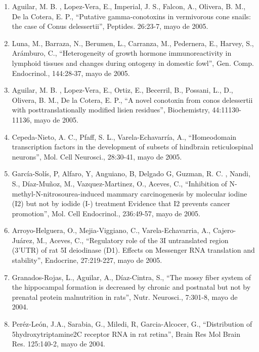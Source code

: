 \begin{enumerate}
\item Aguilar, M. B. , Lopez-Vera, E., Imperial, J. S., Falcon, A., Olivera, B. M., De la Cotera, E. P., “Putative 
gamma-conotoxins in vermivorous cone snails: the case of Conus delessertii”, Peptides. 26:23-7, mayo de 2005.

\item Luna, M., Barraza, N., Berumen, L., Carranza, M., Pedernera, E., Harvey, S., Arámburo, C., “Heterogeneity of growth 
hormone immunoreactivity in lymphoid tissues and changes during ontogeny in domestic fowl”, Gen. Comp. Endocrinol., 
144:28-37, mayo de 2005.

\item Aguilar, M. B. , Lopez-Vera, E., Ortiz, E., Becerril, B., Possani, L., D., Olivera, B. M., De la Cotera, E. P., “A 
novel conotoxin from conos delessertii with posttranslationally modified lisien residues”, Biochemistry, 
44:11130-11136, mayo de 2005.

\item Cepeda-Nieto, A. C., Pfaff, S. L., Varela-Echavarría, A., “Homeodomain transcription factors in the development of 
subsets of hindbrain reticulospinal neurons”, Mol. Cell Neurosci., 28:30-41, mayo de 2005.

\item García-Solís, P, Alfaro, Y, Anguiano, B, Delgado G, Guzman, R. C. , Nandi, S., Díaz-Muñoz, M., Vazquez-Martinez, O., 
Aceves, C., “Inhibition of N-methyl-N-nitrosourea-induced mammary carcinogenesis by molecular iodine (I2) but not by iodide 
(I-) treatment Evidence that I2 prevents cancer promotion”, Mol. Cell Endocrinol., 236:49-57, mayo de 2005.

\item Arroyo-Helguera, O., Mejia-Viggiano, C., Varela-Echavarria, A., Cajero-Juárez, M., Aceves, C., “Regulatory role of 
the 
3I untranslated region (3’UTR) of rat 5I deiodinase (D1). Effects on Messenger RNA translation and stability”, Endocrine, 
27:219-227, mayo de 2005.

\item Granados-Rojas, L., Aguilar, A., Díaz-Cintra, S., “The mossy fiber system of the hippocampal formation is decreased 
by 
chronic and postnatal but not by prenatal protein malnutrition in rats”, Nutr. Neurosci., 7:301-8, mayo de 2004.

\item Peréz-León, J.A., Sarabia, G., Miledi, R, Garcia-Alcocer, G., “Distribution of 5hydroxytriptamine2C receptor RNA in 
rat 
retina”, Brain Res Mol Brain Res. 125:140-2, mayo de 2004.


\end{enumerate}
